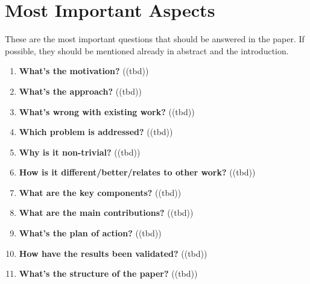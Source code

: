 \section{Most Important Aspects}\label{sec:mia}
These are the most important questions that should be answered in the paper. If possible,
they should be mentioned already in abstract and the introduction.
\begin{enumerate}[resume]
    \item \textbf{What’s the motivation?} 	\textcolor{HighlightColor}{((tbd))}
    \item \textbf{What’s the approach?} 	\textcolor{HighlightColor}{((tbd))}
    \item \textbf{What’s wrong with existing work?} 	\textcolor{HighlightColor}{((tbd))}
    \item \textbf{Which problem is addressed?} 	\textcolor{HighlightColor}{((tbd))}
    \item \textbf{Why is it non-trivial?
} 	\textcolor{HighlightColor}{((tbd))}
    \item \textbf{How is it different/better/relates to other work?
} 	\textcolor{HighlightColor}{((tbd))}
    \item \textbf{What are the key components?} 	\textcolor{HighlightColor}{((tbd))}
    \item \textbf{What are the main contributions?} 	\textcolor{HighlightColor}{((tbd))}
    \item \textbf{What’s the plan of action?} 	\textcolor{HighlightColor}{((tbd))}
    \item \textbf{How have the results been validated?
} 	\textcolor{HighlightColor}{((tbd))}
    \item \textbf{What’s the structure of the paper?} 	\textcolor{HighlightColor}{((tbd))}
\end{enumerate}

